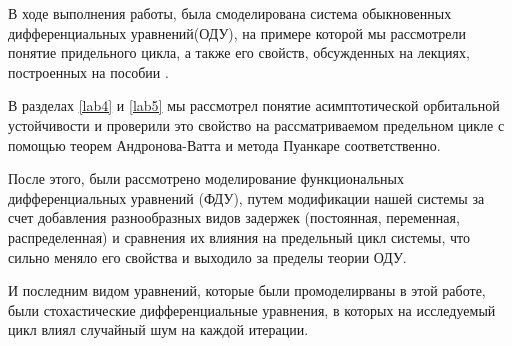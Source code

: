 \Conclusion %
В ходе выполнения работы, была смоделирована система
обыкновенных дифференциальных уравнений(ОДУ), на примере которой
мы рассмотрели понятие придельного цикла, а
также его свойств, обсужденных на лекциях, построенных
на пособии \cite{bookdiff}.

В разделах \ref{lab4} и \ref{lab5} мы рассмотрел понятие асимптотической
орбитальной устойчивости и проверили это свойство на рассматриваемом
предельном цикле с помощью теорем Андронова-Ватта и метода
Пуанкаре соответственно.

После этого, были рассмотрено моделирование функциональных
дифференциальных уравнений (ФДУ), путем модификации
нашей системы за счет добавления разнообразных видов задержек
(постоянная, переменная, распределенная) и сравнения их влияния
на предельный цикл системы, что сильно меняло его свойства
и выходило за пределы теории ОДУ.

И последним видом уравнений, которые были промоделирваны в
этой работе, были стохастические дифференциальные уравнения,
в которых на исследуемый цикл влиял случайный шум на каждой
итерации.

